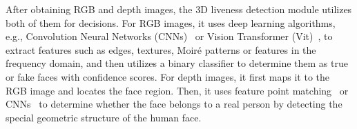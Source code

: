 After obtaining RGB and depth images, the 3D liveness detection module utilizes both of them for decisions.
For RGB images, it uses deep learning algorithms, e.g., Convolution Neural Networks (CNNs)~\cite{yang2014learn, chen2020face, luo2018face} or Vision Transformer (Vit)~\cite{george2020effectiveness}, to extract features such as edges, textures, Moiré patterns or features in the frequency domain,  and then utilizes a binary classifier to determine them as true or fake faces with confidence scores.
For depth images, it first maps it to the RGB image and locates the face region. Then, it uses feature point matching~\cite{goswami2014rgb} or CNNs~\cite{george2021cross, te2020exploring} to determine whether the face belongs to a real person by detecting the special geometric structure of the human face. 






